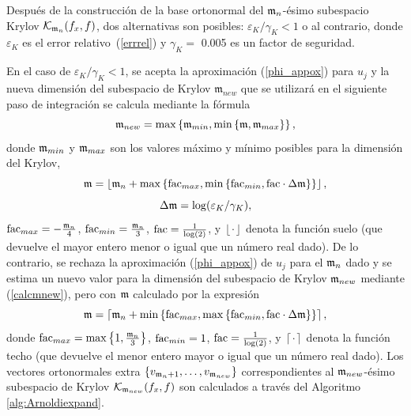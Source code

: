 Después de la construcción de la base ortonormal del $\mathfrak{m}_n$-ésimo subespacio Krylov $\mathcal{K}_{\mathfrak{m}_n}(f_x,f)$, dos alternativas son posibles: $\varepsilon_{K}/\gamma_{K}< 1$ o al contrario, donde $\varepsilon_{K}$
es el error relativo~(\ref{errrel}) y $\gamma_{K}=$ 0.005 es un factor de seguridad.

En el caso de $\varepsilon_{K}/\gamma_{K}< 1$, se acepta la aproximación (\ref{phi_appox}) para $u_j$ y la nueva dimensión del subespacio de Krylov $\mathfrak{m}_{new}$ que se utilizará en el siguiente paso de integración se calcula mediante la fórmula
\begin{equation}\label{calcmnew}
    \mathfrak{m}_{new}= \max\left\{ \mathfrak{m}_{min}, \min\left\{ \mathfrak{m} , \mathfrak{m}_{max}  \right\} \right\},
\end{equation}
    donde $\mathfrak{m}_{min}$ y $\mathfrak{m}_{max}$ son los valores máximo y mínimo posibles para la dimensión del Krylov,
\begin{equation*}
    \mathfrak{m} = \left\lfloor \mathfrak{m}_{n} + \max\left\{ \mathrm{fac}_{max} , \min\left\{ \mathrm{fac}_{min},
            \mathrm{fac}\cdot\Delta\mathfrak{m} \right\}  \right\} \right\rfloor,
\end{equation*}
\begin{equation}
    \Delta\mathfrak{m}=\log(\varepsilon_{K}/\gamma_{K}), \label{delta_m}
\end{equation}
$\mathrm{fac}_{max}= -\frac{\mathfrak{m}_n}{4}$, $\mathrm{fac}_{min}= \frac{\mathfrak{m}_n}{3}$, $\mathrm{fac}=\frac{1}{\log( 2)}$, y $\left\lfloor \cdot \right\rfloor$ denota la función suelo (que devuelve el mayor entero menor o igual que un número real dado). De lo contrario, se rechaza la aproximación (\ref{phi_appox}) de $u_j$ para el $\mathfrak{m}_n$ dado y se estima un nuevo valor para la dimensión del subespacio de Krylov $\mathfrak{m}_{new}$ mediante (\ref{calcmnew}), pero con $\mathfrak{m}$ calculado por la expresión
\begin{equation*}
    \mathfrak{m} = \left\lceil \mathfrak{m}_{n} + \min\left\{ \mathrm{fac}_{max} , \max\left\{ \mathrm{fac}_{min},
            \mathrm{fac}\cdot\Delta\mathfrak{m} \right\}  \right\} \right\rceil,
\end{equation*}
donde $\mathrm{fac}_{max}= \max\left\{  1,\frac{\mathfrak{m}_{n}}{3}  \right\}$, $\mathrm{fac}_{min}= 1 $, $\mathrm{fac}=\frac{1}{\log (2)}$, y $\left\lceil \cdot \right\rceil$ denota la función techo (que devuelve el menor entero mayor o igual que un número real dado). Los vectores ortonormales extra $\{v_{\mathfrak{m}_n+1},\ldots,v_{\mathfrak{m}_{new}} \}$ correspondientes al $\mathfrak{m}_{new}$-ésimo subespacio de Krylov $\mathcal{K}_{\mathfrak{m}_{new}}(f_x,f)$ son calculados a través del Algoritmo \ref{alg:Arnoldiexpand}.
